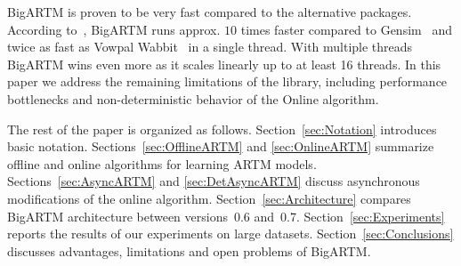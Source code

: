 \documentclass[russian,english]{llncs}
\newcommand{\kw}[1]{\mbox{\textsf{#1}}}
\begin{document}
BigARTM is proven to be very fast compared to the alternative packages.
According to~\cite{vfardi15aist}, BigARTM
runs approx. $10$ times faster compared to Gensim~\cite{rehurek10software}
and twice as fast as
Vowpal Wabbit~\cite{langford07vw}
in a single thread.
With multiple threads BigARTM wins even more
as it scales linearly up to at least 16 threads.
In this paper we address the remaining limitations of the library,
including performance bottlenecks
and non-deterministic behavior of the Online algorithm.



The rest of the paper is organized as follows.
Section~\ref{sec:Notation}
introduces basic notation.
Sections~\ref{sec:OfflineARTM} and \ref{sec:OnlineARTM}
summarize offline and online algorithms for learning ARTM models.
Sections~\ref{sec:AsyncARTM} and \ref{sec:DetAsyncARTM}
discuss asynchronous modifications of the online algorithm.
Section~\ref{sec:Architecture}
compares BigARTM architecture between versions~\kw{0.6} and~\kw{0.7}.
Section~\ref{sec:Experiments}
reports the results of our experiments on large datasets.
Section~\ref{sec:Conclusions}
discusses advantages, limitations and open problems of BigARTM.
\end{document}
